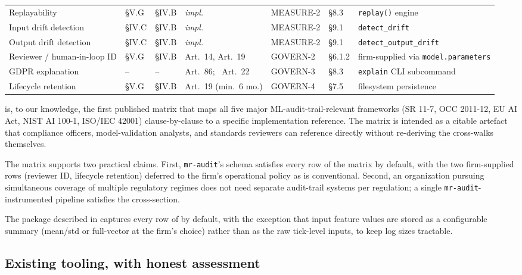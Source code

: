 \begin{landscape}
\begin{table}
\begin{tabular}{@{}p{4.0cm}p{2.4cm}p{1.9cm}p{2.8cm}p{2.6cm}p{1.6cm}p{5.0cm}@{}}
Replayability & §V.G & §IV.B & \textit{impl.} & MEASURE-2 & §8.3 & \texttt{replay()} engine \\
Input drift detection & §IV.C & §IV.B & \textit{impl.} & MEASURE-2 & §9.1 & \texttt{detect\_drift} \\
Output drift detection & §IV.C & §IV.B & \textit{impl.} & MEASURE-2 & §9.1 & \texttt{detect\_output\_drift} \\
Reviewer / human-in-loop ID & §V.G & §IV.B & Art.~14, Art.~19 & GOVERN-2 & §6.1.2 & firm-supplied via \texttt{model.parameters} \\
GDPR explanation & -- & -- & Art.~86; \citet{GDPR}~Art.~22 & GOVERN-3 & §8.3 & \texttt{explain} CLI subcommand \\
Lifecycle retention & §V.G & §IV.B & Art.~19 (min.~6 mo.) & GOVERN-4 & §7.5 & filesystem persistence \\
\bottomrule
\end{tabular}
\end{table}
\end{landscape}

 is, to our knowledge, the first published matrix that maps all five major ML-audit-trail-relevant frameworks (SR 11-7, OCC 2011-12, EU AI Act, NIST AI 100-1, ISO/IEC 42001) clause-by-clause to a specific implementation reference. The matrix is intended as a citable artefact that compliance officers, model-validation analysts, and standards reviewers can reference directly without re-deriving the cross-walks themselves.

The matrix supports two practical claims. First, \texttt{mr-audit}'s schema satisfies every row of the matrix by default, with the two firm-supplied rows (reviewer ID, lifecycle retention) deferred to the firm's operational policy as is conventional. Second, an organization pursuing simultaneous coverage of multiple regulatory regimes does not need separate audit-trail systems per regulation; a single \texttt{mr-audit}-instrumented pipeline satisfies the cross-section.

The package described in  captures every row of  by default, with the exception that input feature values are stored as a configurable summary (mean/std or full-vector at the firm's choice) rather than as the raw tick-level inputs, to keep log sizes tractable.

\subsection{Existing tooling, with honest assessment}\label{sec:existing_tools}

